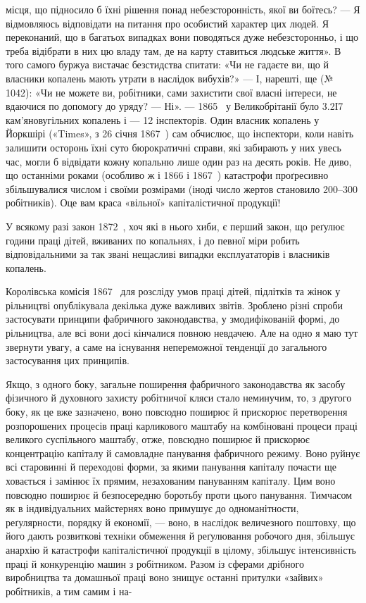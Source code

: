 \parcont{}  %
місця, що підносило б їхні рішення понад небезсторонність, якої
ви боїтесь? — Я відмовляюсь відповідати на питання про особистий
характер цих людей. Я переконаний, що в багатьох випадках
вони поводяться дуже небезсторонньо, і що треба відібрати
в них цю владу там, де на карту ставиться людське життя».
В того самого буржуа вистачає безстидства спитати: «Чи не гадаєте
ви, що й власники копалень мають утрати в наслідок вибухів?»
— І, нарешті, ще (№ 1042): «Чи не можете ви, робітники,
сами захистити свої власні інтереси, не вдаючися по допомогу
до уряду? — Ні». — 1865~ у Великобрітанії було 3.2І7 кам’яновугільних
копалень і — 12 інспекторів. Один власник копалень
у Йоркшірі («Times», з 26 січня 1867~) сам обчислює, що
інспектори, коли навіть залишити осторонь їхні суто бюрократичні
справи, які забирають у них увесь час, могли б відвідати
кожну копальню лише один раз на десять років. Не диво, що
останніми роками (особливо ж і 1866 і 1867~) катастрофи проґресивно
збільшувалися числом і своїми розмірами (іноді число
жертов становило 200--300 робітників). Оце вам краса «вільної»
капіталістичної продукції!

У всякому разі закон 1872~, хоч які в нього хиби, є перший
закон, що реґулює години праці дітей, вживаних по копальнях,
і до певної міри робить відповідальними за так звані нещасливі
випадки експлуататорів і власників копалень.

Королівська комісія 1867~ для розсліду умов праці дітей,
підлітків та жінок у рільництві опублікувала декілька дуже
важливих звітів. Зроблено різні спроби застосувати принципи
фабричного законодавства, у змодифікованій формі, до рільництва,
але всі вони досі кінчалися повною невдачею. Але на одно
я маю тут звернути увагу, а саме на існування непереможної
тенденції до загального застосування цих принципів.

Якщо, з одного боку, загальне поширення фабричного законодавства
як засобу фізичного й духовного захисту робітничої
кляси стало неминучим, то, з другого боку, як це вже зазначено,
воно повсюдно поширює й прискорює перетворення розпорошених
процесів праці карликового маштабу на комбіновані процеси
праці великого суспільного маштабу, отже, повсюдно поширює
й прискорює концентрацію капіталу й самовладне панування
фабричного режиму. Воно руйнує всі старовинні й переходові
форми, за якими панування капіталу почасти ще ховається і
замінює їх прямим, незахованим пануванням капіталу. Цим
воно повсюдно поширює й безпосередню боротьбу проти цього
панування. Тимчасом як в індивідуальних майстернях воно примушує
до одноманітности, реґулярности, порядку й економії, —
воно, в наслідок величезного поштовху, що його дають розвиткові
техніки обмеження й реґулювання робочого дня, збільшує
анархію й катастрофи капіталістичної продукції в цілому, збільшує
інтенсивність праці й конкуренцію машин з робітником. Разом
із сферами дрібного виробництва та домашньої праці воно знищує
останні притулки «зайвих» робітників, а тим самим і на-
\parbreak{}  %
